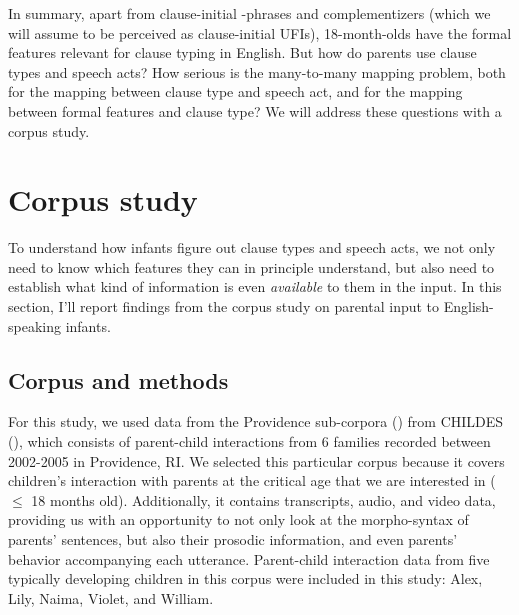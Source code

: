 


In summary, apart from clause-initial \twh-phrases and complementizers (which we will assume to be perceived as clause-initial UFIs), 18-month-olds have the formal features relevant for clause typing in English. But how do parents use clause types and speech acts? How serious is the many-to-many mapping problem, both for the mapping between clause type and speech act, and for the mapping between formal features and clause type? We will address these questions with a corpus study. %

\section{Corpus study}
\label{sec:engcl:corpus}
To understand how infants figure out clause types and speech acts, we not only need to know which features they can in principle understand, but also need to establish what kind of information is even \emph{available} to them in the input. In this section, I’ll report findings from the corpus study on parental input to English-speaking infants. 


\subsection{Corpus and methods}
\label{sec:engcl:corpus:methods}
For this study, we used data from the Providence sub-corpora (\cite{ProvidenceCorpus}) from CHILDES (\cite{CHILDES}), which consists of parent-child interactions from 6 families recorded between 2002-2005 in Providence, RI. We selected this particular corpus because it covers children’s interaction with parents at the critical age that we are interested in ($\leq$ 18 months old). Additionally, it contains transcripts, audio, and video data, providing us with an opportunity to not only look at the morpho-syntax of parents’ sentences, but also their prosodic information, and even parents’ behavior accompanying each utterance. Parent-child interaction data from five typically developing children in this corpus were included in this study: Alex, Lily, Naima, Violet, and William. %


